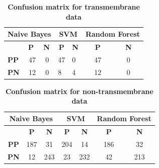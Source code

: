 \documentclass[10pt,letterpaper]{article}
\begin{document}
	\begin{table}[!ht]
		\centering
		\caption{{\bf Confusion matrix for transmembrane data}}
		\label{tab:conf-tm}
		\begin{tabular}{lccllcc}
			\multicolumn{3}{l}{Naive Bayes}                                                & \multicolumn{2}{c}{SVM}                                          & \multicolumn{2}{l}{Random Forest} \\ \hline
			& \multicolumn{1}{l}{\textbf{P}} & \multicolumn{1}{l|}{\textbf{N}} & \multicolumn{1}{c}{\textbf{P}} & \multicolumn{1}{c|}{\textbf{N}} & \textbf{P}      & \textbf{N}      \\ \hline
			\textbf{PP} & 47                             & \multicolumn{1}{c|}{0}          & 47                             & \multicolumn{1}{l|}{0}          & 47              & 0               \\
			\textbf{PN} & 12                             & \multicolumn{1}{c|}{0}          & 8                              & \multicolumn{1}{l|}{4}          & 12              & 0               \\ \hline
		\end{tabular}
	\end{table}

	\begin{table}[!ht]
		\centering
		\caption{{\bf Confusion matrix for non-transmembrane data}}
		\label{tab:conf-non-tm}
		\begin{tabular}{ccccccc}
			\multicolumn{3}{c}{Naive Bayes}                            & \multicolumn{2}{c}{SVM}                      & \multicolumn{2}{c}{Random Forest} \\ \hline
			& \textbf{P} & \multicolumn{1}{c|}{\textbf{N}} & \textbf{P} & \multicolumn{1}{c|}{\textbf{N}} & \textbf{P}      & \textbf{N}      \\ \hline
			\textbf{PP} & 187        & \multicolumn{1}{c|}{31}         & 204        & \multicolumn{1}{c|}{14}         & 186             & 32              \\
			\textbf{PN} & 12         & \multicolumn{1}{c|}{243}        & 23         & \multicolumn{1}{c|}{232}        & 42              & 213             \\ \hline
		\end{tabular}
	\end{table}
\end{document}
